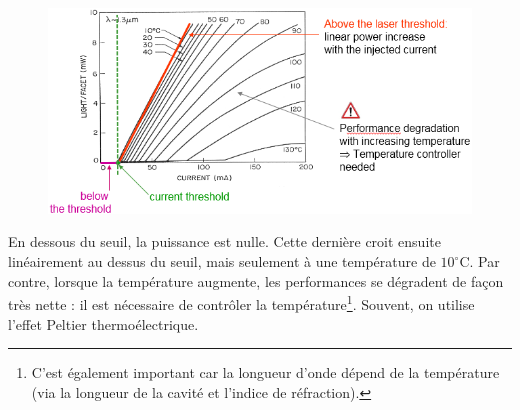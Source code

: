 	\begin{figure}
	\vspace{-5mm}
	\includegraphics[scale=0.6]{ch4/image23}
	\end{figure}
En dessous du seuil, la puissance est nulle. Cette dernière croit ensuite linéairement au dessus 
du seuil, mais seulement à une température de $10^\circ$C. Par contre, lorsque la température augmente,
les performances se dégradent de façon très nette : il est nécessaire de contrôler 
la température\footnote{C'est également important car la longueur d'onde dépend de la température (via 
la longueur de la cavité et l'indice de réfraction).}. Souvent, on utilise l'effet Peltier 
thermoélectrique.


